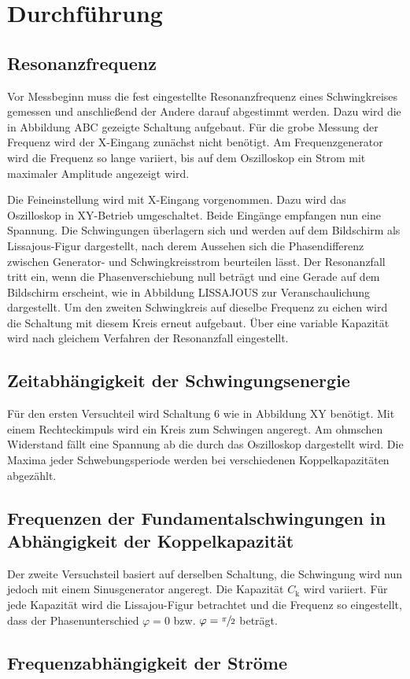 \section{Durchführung}
\label{sec:Durchfuehrung}
\subsection{Resonanzfrequenz}
Vor Messbeginn muss die fest eingestellte Resonanzfrequenz eines Schwingkreises gemessen und anschließend der Andere darauf abgestimmt werden. Dazu wird die in Abbildung ABC gezeigte Schaltung aufgebaut. Für die grobe Messung der Frequenz wird der X-Eingang zunächst nicht benötigt. Am Frequenzgenerator wird die Frequenz so lange variiert, bis auf dem Oszilloskop ein Strom mit maximaler Amplitude angezeigt wird.

Die Feineinstellung wird mit X-Eingang vorgenommen.
Dazu wird das Oszilloskop in XY-Betrieb umgeschaltet. Beide Eingänge empfangen nun eine Spannung. Die Schwingungen überlagern sich und werden auf dem Bildschirm als Lissajous-Figur dargestellt, nach derem Aussehen sich die Phasendifferenz zwischen Generator- und Schwingkreisstrom beurteilen lässt. 
Der Resonanzfall tritt ein, wenn die Phasenverschiebung null beträgt und eine Gerade auf dem Bildschirm erscheint, wie in Abbildung LISSAJOUS zur Veranschaulichung dargestellt.
Um den zweiten Schwingkreis auf dieselbe Frequenz zu eichen wird die Schaltung mit diesem Kreis erneut aufgebaut. Über eine variable Kapazität wird nach gleichem Verfahren der Resonanzfall eingestellt.

\subsection{Zeitabhängigkeit der Schwingungsenergie}

Für den ersten Versuchteil wird Schaltung 6 wie in Abbildung XY benötigt. Mit einem Rechteckimpuls wird ein Kreis zum Schwingen angeregt. Am ohmschen Widerstand fällt eine Spannung ab die durch das Oszilloskop dargestellt wird. Die Maxima jeder Schwebungsperiode werden bei verschiedenen Koppelkapazitäten abgezählt.

\subsection{Frequenzen der Fundamentalschwingungen in Abhängigkeit der Koppelkapazität}
Der zweite Versuchsteil basiert auf derselben Schaltung, die Schwingung wird nun jedoch mit einem Sinusgenerator angeregt.
Die Kapazität $C_\mathup{k}$ wird variiert. Für jede Kapazität wird die Lissajou-Figur betrachtet und die Frequenz so eingestellt, dass der Phasenunterschied $\varphi=0$ bzw. $\varphi=\sfrac{\pi}{2}$ beträgt.

\subsection{Frequenzabhängigkeit der Ströme}


